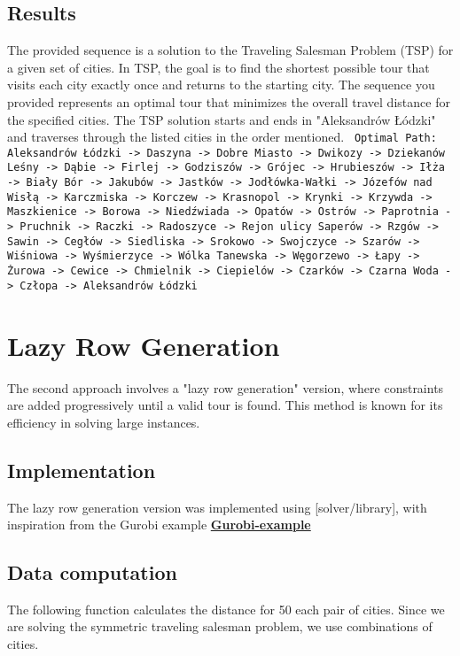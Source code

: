 \subsection*{Results}
The provided sequence is a solution to the Traveling Salesman Problem (TSP) for a given set of cities. In TSP, the goal is to find the shortest possible tour that visits each city exactly once and returns to the starting city. The sequence you provided represents an optimal tour that minimizes the overall travel distance for the specified cities. The TSP solution starts and ends in "Aleksandrów Łódzki" and traverses through the listed cities in the order mentioned.\newline\newline
\texttt{
Optimal Path:
Aleksandrów Łódzki -> Daszyna -> Dobre Miasto -> Dwikozy -> Dziekanów Leśny -> Dąbie -> Firlej -> Godziszów -> Grójec -> Hrubieszów -> Iłża -> Biały Bór -> Jakubów -> Jastków -> Jodłówka-Wałki -> Józefów nad Wisłą -> Karczmiska -> Korczew -> Krasnopol -> Krynki -> Krzywda -> Maszkienice -> Borowa -> Niedźwiada -> Opatów -> Ostrów -> Paprotnia -> Pruchnik -> Raczki -> Radoszyce -> Rejon ulicy Saperów -> Rzgów -> Sawin -> Cegłów -> Siedliska -> Srokowo -> Swojczyce -> Szarów -> Wiśniowa -> Wyśmierzyce -> Wólka Tanewska -> Węgorzewo -> Łapy -> Żurowa -> Cewice -> Chmielnik -> Ciepielów -> Czarków -> Czarna Woda -> Człopa -> Aleksandrów Łódzki
}

\section*{Lazy Row Generation}

The second approach involves a "lazy row generation" version, where constraints are added progressively until a valid tour is found. This method is known for its efficiency in solving large instances.

\subsection*{Implementation}

The lazy row generation version was implemented using [solver/library], with inspiration from the Gurobi example \href{https://colab.research.google.com/github/Gurobi/modeling-examples/blob/master/traveling_salesman/tsp.ipynb}{\textbf{Gurobi-example}} 
\subsection*{Data computation}The following function calculates the distance for 50 each pair of cities. Since we are solving the symmetric traveling salesman problem, we use combinations of cities.


